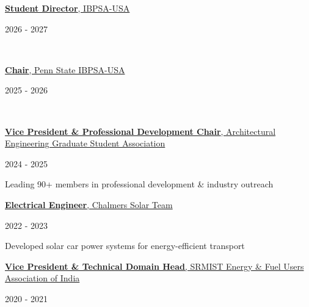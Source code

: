 \documentclass[]{Keval-resume}
\begin{document}
{{\begin{minipage}[t]{.85\textwidth}
	 \href{}{{\textbf{Student Director}, IBPSA-USA} }
\end{minipage}%
\begin{minipage}[t]{.15\textwidth}
	\hfill 2026 - 2027
\end{minipage}
\\

\begin{minipage}[t]{.85\textwidth}
	 \href{}{{\textbf{Chair}, Penn State IBPSA-USA} }
\end{minipage}%
\begin{minipage}[t]{.15\textwidth}
	\hfill 2025 - 2026
\end{minipage}
\\

\begin{minipage}[t]{.85\textwidth}
	 \href{}{{\textbf{Vice President \& Professional Development Chair}, Architectural Engineering Graduate Student Association} }
\end{minipage}%
\begin{minipage}[t]{.15\textwidth}
	\hfill 2024 - 2025
\end{minipage}

\hspace{1.5em} \textbullet{} Leading 90+ members in professional development \& industry outreach\\
\begin{minipage}[t]{.6\textwidth}
	 \href{}{{\textbf{Electrical Engineer}, Chalmers Solar Team }}
\end{minipage}%
\begin{minipage}[t]{.4\textwidth}
	\hfill 2022 - 2023
\end{minipage}

\hspace{1.5em} \textbullet{}Developed solar car power systems for energy-efficient transport\\
\begin{minipage}[t]{.8\textwidth}
	 \href{}{{\textbf{Vice President \& Technical Domain Head}, SRMIST Energy \& Fuel Users Association of India }}
\end{minipage}%
\begin{minipage}[t]{.2\textwidth}
	\hfill 2020 - 2021
\end{minipage}

}}
\end{document}
